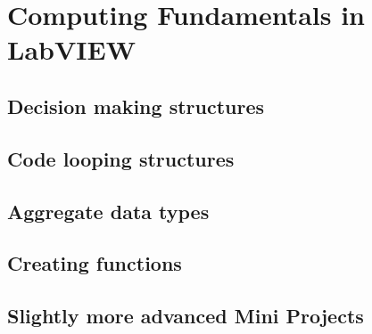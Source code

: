 \chapter{Computing Fundamentals in LabVIEW}
\section{Decision making structures}

\section{Code looping structures}

\section{Aggregate data types}

\section{Creating functions}

\section{Slightly more advanced Mini Projects}